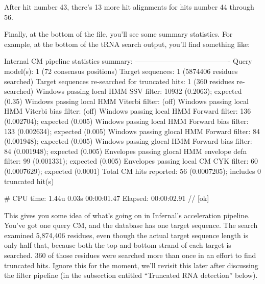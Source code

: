 After hit number 43, there's 13 more hit alignments for hits number 44
through 56. 

Finally, at the bottom of the file, you'll see some summary
statistics. For example, at the bottom of the tRNA search output,
you'll find something like:

\newpage

\begin{sreoutput}
Internal CM pipeline statistics summary:
----------------------------------------
Query model(s):                                                  1  (72 consensus positions)
Target sequences:                                                1  (5874406 residues searched)
Target sequences re-searched for truncated hits:                 1  (360 residues re-searched)
Windows   passing  local HMM SSV           filter:           10932  (0.2063); expected (0.35)
Windows   passing  local HMM Viterbi       filter:                  (off)
Windows   passing  local HMM Viterbi  bias filter:                  (off)
Windows   passing  local HMM Forward       filter:             136  (0.002704); expected (0.005)
Windows   passing  local HMM Forward  bias filter:             133  (0.002634); expected (0.005)
Windows   passing glocal HMM Forward       filter:              84  (0.001948); expected (0.005)
Windows   passing glocal HMM Forward  bias filter:              84  (0.001948); expected (0.005)
Envelopes passing glocal HMM envelope defn filter:              99  (0.001331); expected (0.005)
Envelopes passing  local CM  CYK           filter:              60  (0.0007629); expected (0.0001)
Total CM hits reported:                                         56  (0.0007205); includes 0 truncated hit(s)

# CPU time: 1.44u 0.03s 00:00:01.47 Elapsed: 00:00:02.91
//
[ok]
\end{sreoutput}

This gives you some idea of what's going on in Infernal's acceleration
pipeline. You've got one query CM, and the database has one target
sequence. The search examined 5,874,406 residues, even though the
actual target sequence length is only half that, because both the top
and bottom strand of each target is searched. 360 of those residues
were searched more than once in an effort to find truncated
hits. Ignore this for the moment, we'll revisit this later after
discussing the filter pipeline (in the subsection entitled ``Truncated
RNA detection'' below).

